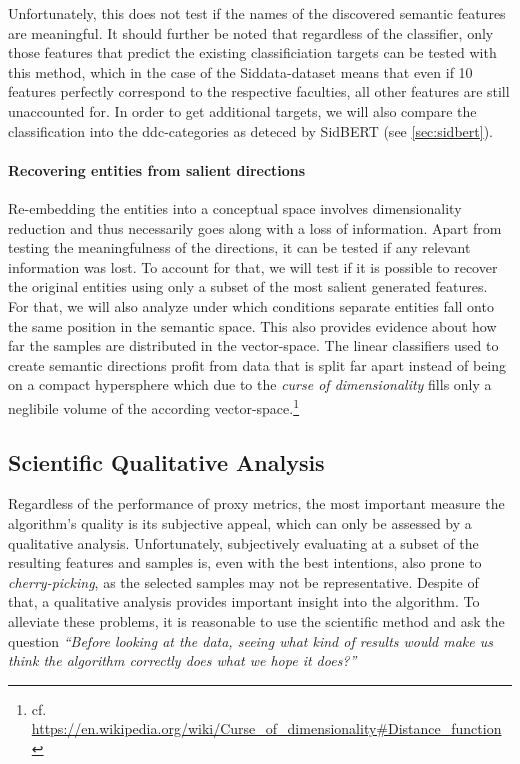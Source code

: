 Unfortunately, this does not test if the names of the discovered semantic features are meaningful. It should further be noted that regardless of the classifier, only those features that predict the existing classificiation targets can be tested with this method, which in the case of the Siddata-dataset means that even if 10 features perfectly correspond to the respective faculties, all other features are still unaccounted for. In order to get additional targets, we will also compare the classification into the \gls{ddc}-categories as deteced by SidBERT (see \autoref{sec:sidbert}).

\paragraph{Recovering entities from salient directions} Re-embedding the entities into a conceptual space involves dimensionality reduction and thus necessarily goes along with a loss of information. Apart from testing the meaningfulness of the directions, it can be tested if any relevant information was lost. To account for that, we will test if it is possible to recover the original entities using only a subset of the most salient generated features. For that, we will also analyze under which conditions separate entities fall onto the same position in the semantic space. This also provides evidence about how far the samples are distributed in the vector-space. The linear classifiers used to create semantic directions profit from data that is split far apart instead of being on a compact hypersphere which due to the \textit{curse of dimensionality} fills only a neglibile volume of the according vector-space.\footnote{cf. \url{https://en.wikipedia.org/wiki/Curse_of_dimensionality\#Distance_function}}

\subsection{Scientific Qualitative Analysis}

Regardless of the performance of proxy metrics, the most important measure the algorithm's quality is its subjective appeal, which can only be assessed by a qualitative analysis. Unfortunately, subjectively evaluating at a subset of the resulting features and samples is, even with the best intentions, also prone to  \textit{cherry-picking}, as the selected samples may not be representative. Despite of that, a qualitative analysis provides important insight into the algorithm. To alleviate these problems, it is reasonable to use the scientific method and ask the question \textit{``Before looking at the data, seeing what kind of results would make us think the algorithm correctly does what we hope it does?''}

